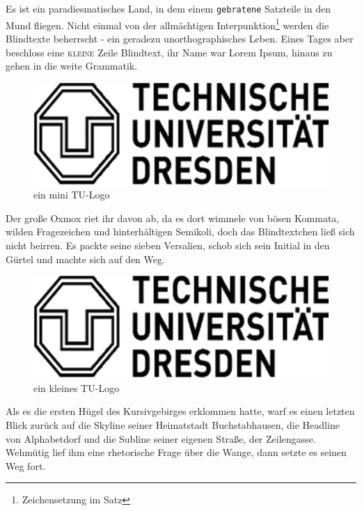 \documentclass[%
	12pt,%
	a4paper,%
	oneside,%
	listof=totoc,
 	index=totoc,
	bibliography = totoc,
	parskip = half,%
	chapterprefix=false,%
	appendixprefix, %
headings=small,%
]{scrreprt}
\newcommand{\alt}[1]{}%
\begin{document}
Es ist ein paradiesmatisches Land, in dem einem \texttt{gebratene} Satzteile in den Mund fliegen. Nicht einmal von der allmächtigen Interpunktion\footnote{Zeichensetzung im Satz} werden die Blindtexte beherrscht - ein geradezu unorthographisches Leben. Eines Tages aber beschloss eine \textsc{kleine} Zeile Blindtext, ihr Name war Lorem Ipsum, hinaus zu gehen in die weite Grammatik.

\begin{figure}[htbp]
		\centering
		\alt{Ich bin das Logo der Technischen Universität Dresden}
		\includegraphics[scale=0.10]{images/tu_logo}%
	\caption[kurz]{ein mini TU-Logo}%
	\label{fig:minitulogo}
\end{figure}

Der große Oxmox riet ihr davon ab, da es dort wimmele von bösen Kommata, wilden Fragezeichen und hinterhältigen Semikoli, doch das Blindtextchen ließ sich nicht beirren. Es packte seine sieben Versalien, schob sich sein Initial in den Gürtel und machte sich auf den Weg. 

\begin{figure}[htbp]
		\centering
		\alt{Ich bin das Logo der Technischen Universität Dresden}
		\includegraphics[scale=0.25]{images/tu_logo}%
	\caption{ein kleines TU-Logo}%
	\label{fig:kleinestulogo}
\end{figure}

Als es die ersten Hügel des Kursivgebirges erklommen hatte, warf es einen letzten Blick zurück auf die Skyline seiner Heimatstadt Buchstabhausen, die Headline von Alphabetdorf und die Subline seiner eigenen Straße, der Zeilengasse. Wehmütig lief ihm eine rhetorische Frage über die Wange, dann setzte es seinen Weg fort.
\end{document}
